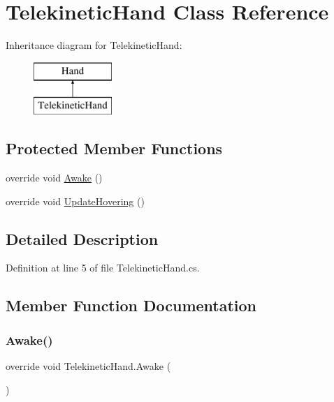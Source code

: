 \hypertarget{class_telekinetic_hand}{}\section{Telekinetic\+Hand Class Reference}
\label{class_telekinetic_hand}
Inheritance diagram for Telekinetic\+Hand\+:\begin{figure}[H]
\begin{center}
\leavevmode
\includegraphics[height=2.000000cm]{class_telekinetic_hand}
\end{center}
\end{figure}
\subsection*{Protected Member Functions}
\begin{DoxyCompactItemize}
\item 
override void \mbox{\hyperlink{class_telekinetic_hand_aec2c17c94a9e6db5375921221ed99369}{Awake}} ()
\item 
override void \mbox{\hyperlink{class_telekinetic_hand_a625aaa03a03c5ece9ffdf4afe2e30ab7}{Update\+Hovering}} ()
\end{DoxyCompactItemize}


\subsection{Detailed Description}


Definition at line 5 of file Telekinetic\+Hand.\+cs.



\subsection{Member Function Documentation}
\mbox{\label{class_telekinetic_hand_aec2c17c94a9e6db5375921221ed99369}} 
\subsubsection{\texorpdfstring{Awake()}{Awake()}}
{\footnotesize\ttfamily override void Telekinetic\+Hand.\+Awake (\begin{DoxyParamCaption}{ }\end{DoxyParamCaption})\hspace{0.3cm}{\ttfamily [protected]}}



